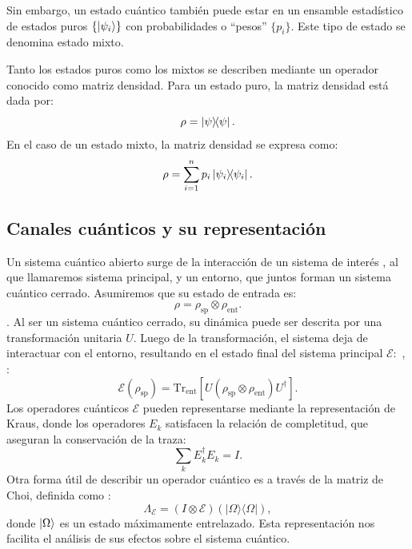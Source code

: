 \documentclass[11pt, spanish, letterpage]{article} %
\begin{document}
Sin embargo, un estado cuántico también puede estar en un ensamble estadístico
de estados puros $\{\ket{\psi_i}\}$ con probabilidades o ``pesos'' $\{p_i\}$. Este tipo
de estado se denomina estado mixto.  

Tanto los estados puros como los mixtos se describen mediante un operador
conocido como matriz densidad. Para un estado puro, la matriz densidad está
dada por:
\begin{equation}
    \label{ec:1.5}
    \rho = \ketbra{\psi}.
\end{equation}
En el caso de un estado mixto, la matriz densidad se expresa como:
\begin{equation}
\label{dens_mixtos}
    \rho = \sum_{i=1}^{n} p_i \ketbra{\psi_i}.
\end{equation}




\subsection{Canales cuánticos y su representación}
Un sistema cuántico abierto surge de la interacción de un sistema de interés , al que llamaremos sistema principal, y un entorno, que juntos forman un sistema cuántico cerrado. Asumiremos que su estado de entrada es\cite{nielsen_chuang_2011}:
\begin{equation}
    \rho = \rho_{\text{sp}} \otimes \rho_{\text{ent}}.
\end{equation}  . 
Al ser un sistema cuántico cerrado, su dinámica puede ser descrita por una transformación unitaria $U$. Luego de la transformación, el sistema deja de interactuar con el entorno, resultando en el estado final del sistema principal $\mathcal{E}:$  , :
\begin{equation}
    \mathcal{E}(\rho_{\text{sp}}) = \text{Tr}_{\text{ent}}[ U( \rho_{\text{sp}} \otimes \rho_{\text{ent}} ) U^\dagger ].
\end{equation}
Los operadores cuánticos $\mathcal{E}$ pueden representarse mediante la representación de Kraus, donde los operadores ${E_k}$ satisfacen la relación de completitud, que aseguran la conservación de la traza:
\begin{equation}
\sum_k E_k^\dagger E_k = I.
\end{equation} 
Otra forma útil de describir un operador cuántico es a través de la matriz de Choi, definida como \cite{Choi2024}:
\begin{equation}
\Lambda_{\mathcal{E}} = (I \otimes \mathcal{E})(|\Omega\rangle\langle\Omega|),
\end{equation}
donde $\ket{\Omega}$ es un estado máximamente entrelazado. Esta representación nos facilita el análisis de sus efectos sobre el sistema cuántico. 
\end{document}
